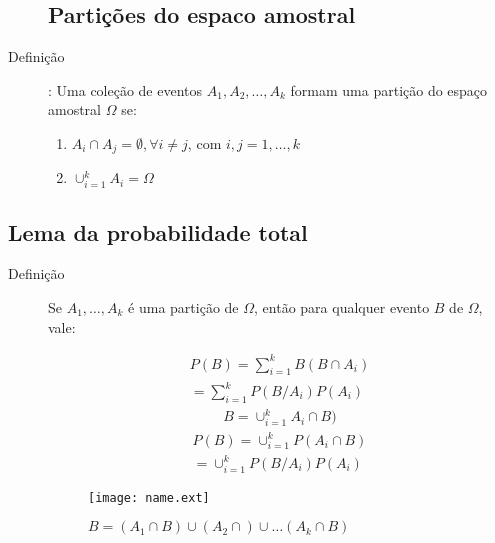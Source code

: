\documentclass[11pt,a4paper]{book}
\begin{document}
\begin{description}
 \subsection{Partições do espaco amostral}
     \item[Definição]: Uma coleção de eventos $A_1, A_2, \ldots, A_k$ formam uma partição 
     do espaço amostral $\Omega$ se:

     \begin{enumerate}[leftmargin=*, label=\Roman*., widest=IV, align=left]
       \item $A_i \cap A_j = \emptyset, \forall i\neq j$, com $i,j =1,\ldots,k$
       \item $\cup_{i=1}^{k}A_i= \Omega$
     \end{enumerate}
   \end{description}
   \subsection{Lema da probabilidade total}
   \begin{description}
     \item [Definição] Se $A_1,\ldots, A_k$ é uma partição de $\Omega$, então para qualquer evento $B$ de $\Omega$, vale:

     \begin{align}
       P(B)= \sum^k_{i=1} B(B \cap A_i)\\ \nonumber
       = \sum^k_{i=1} P(B/A_i)P(A_i)
     \end{align}
     \begin{align}
       B= \cup_{i=1}^k A_i \cap B)
     \end{align}
     \begin{align}
       P(B)= \cup_{i=1}^k P(A_i \cap B)\\ \nonumber
       = \cup_{i=1}^k P(B/A_i)P(A_i)
     \end{align}
     \begin{figure}[htpb]
       \centering
       \texttt{[image: name.ext]}
       \caption{$B=(A_1 \cap B) \cup (A_2 \cap)\cup \dots (A_k \cap B)$ }
       \label{fig:20}
     \end{figure}
   \end{description}
\end{document}
